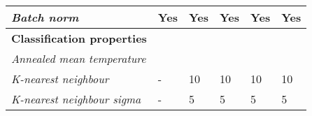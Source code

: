 \begin{table}[]
\begin{tabular}{|l|l|l|l|l|l|}
		\textit{Batch norm}                & Yes                                                               & Yes                                                               & Yes                                                               & Yes                                                                                      & Yes                                                                            \\ \hline
		\textbf{Classification properties} &                                                                   &                                                                   &                                                                   &                                                                                          &                                                                                \\ \hline
		\textit{Annealed mean temperature} &                                                                   &                                                                   &                                                                   &                                                                                          &                                                                                \\ \hline
		\textit{K-nearest neighbour}       & -                                                                 & 10                                                                & 10                                                                & 10                                                                                       & 10                                                                             \\ \hline
		\textit{K-nearest neighbour sigma} & -                                                                 & 5                                                                 & 5                                                                 & 5                                                                                        & 5                                                                              \\ \hline
	\end{tabular}
\end{table}
